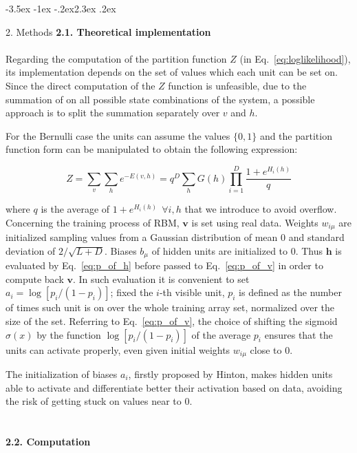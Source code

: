 \documentclass[prl,twocolumn]{revtex4-1}
\makeatletter
\renewcommand{\section}{\@startsection{section}{1}{\z@}%
	{-3.5ex \@plus -1ex \@minus -.2ex}{2.3ex \@plus.2ex}%
	{\normalfont\bfseries\raggedright}}
\numberwithin{equation}{section}
\makeatother
\begin{document}
\section{2. Methods}
\noindent\textbf{2.1. Theoretical implementation}
\\
\\
Regarding the computation of the partition function $Z$ (in Eq.~\ref{eq:loglikelihood}), its implementation depends on the set of values which each unit can be set on. Since the direct computation of the $Z$ function is unfeasible, due to the summation of on all possible state combinations of the system, a possible approach is to split the summation separately over $v$ and $h$.

For the Bernulli case the units can assume the values $\{0,1\}$ and the partition function form can be manipulated to obtain the following expression:

\begin{equation}
	Z=\sum_v\sum_h{e^{-E(v,h)}}=q^D\sum_h{G(h)\prod_{i=1}^D{\frac{1+e^{H_i(h)}}{q}}}
	\label{eq:Z_function_bernulli}
\end{equation}

where $q$ is the average of $1+e^{H_i(h)}\ \ \forall{i,h}$ that we introduce to avoid overflow. Concerning the training process of RBM, $\mathbf{v}$ is set using real data. Weights $w_{i\mu}$ are initialized sampling values from a Gaussian distribution of mean $0$ and standard deviation of $2/\sqrt{L+D}$. Biases $b_\mu$ of hidden units are initialized to $0$. Thus $\mathbf{h}$ is evaluated by Eq.~\ref{eq:p_of_h} before passed to Eq.~\ref{eq:p_of_v} in order to compute back $\mathbf{v}$. In such evaluation it is convenient to set $a_i=\log[p_i/(1-p_i)]$; fixed the $i$-th visible unit, $p_i$ is defined as the number of times such unit is on over the whole training array set, normalized over the size of the set. Referring to Eq.~\ref{eq:p_of_v}, the choice of shifting the sigmoid $\sigma(x)$ by the function $\log[p_i/(1-p_i)]$ of the average $p_i$ ensures that the units can activate properly, even given initial weights $w_{i\mu}$ close to $0$.

The initialization of biases $a_i$, firstly proposed by Hinton, makes hidden units able to activate and differentiate better their activation based on data, avoiding the risk of getting stuck on values near to $0$.
\\
\\
\\
\noindent\textbf{2.2. Computation}
\\
\\
\end{document}

